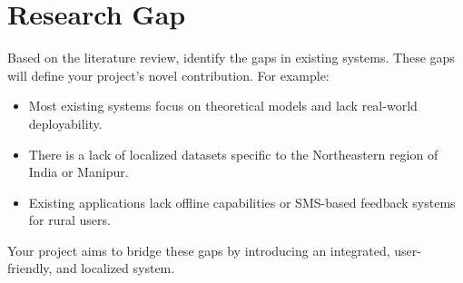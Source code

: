 \section{Research Gap}
Based on the literature review, identify the gaps in existing systems. These gaps will define your project's novel contribution. For example:
\begin{itemize}
    \item Most existing systems focus on theoretical models and lack real-world deployability.
    \item There is a lack of localized datasets specific to the Northeastern region of India or Manipur.
    \item Existing applications lack offline capabilities or SMS-based feedback systems for rural users.
\end{itemize}
Your project aims to bridge these gaps by introducing an integrated, user-friendly, and localized system.
